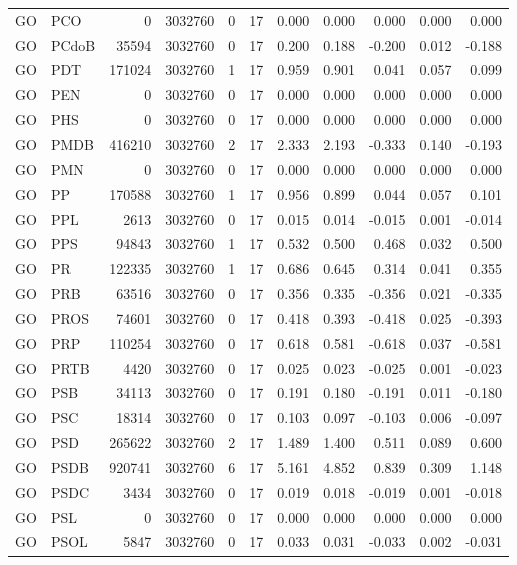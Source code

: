 \begin{landscape}
\begin{longtable}{llrrrrrrrrr}
GO & PCO & 0 & 3032760 & 0 & 17 & 0.000 & 0.000 & 0.000 & 0.000 & 0.000 \\
GO & PCdoB & 35594 & 3032760 & 0 & 17 & 0.200 & 0.188 & -0.200 & 0.012 & -0.188 \\
GO & PDT & 171024 & 3032760 & 1 & 17 & 0.959 & 0.901 & 0.041 & 0.057 & 0.099 \\
GO & PEN & 0 & 3032760 & 0 & 17 & 0.000 & 0.000 & 0.000 & 0.000 & 0.000 \\
GO & PHS & 0 & 3032760 & 0 & 17 & 0.000 & 0.000 & 0.000 & 0.000 & 0.000 \\
GO & PMDB & 416210 & 3032760 & 2 & 17 & 2.333 & 2.193 & -0.333 & 0.140 & -0.193 \\
GO & PMN & 0 & 3032760 & 0 & 17 & 0.000 & 0.000 & 0.000 & 0.000 & 0.000 \\
GO & PP & 170588 & 3032760 & 1 & 17 & 0.956 & 0.899 & 0.044 & 0.057 & 0.101 \\
GO & PPL & 2613 & 3032760 & 0 & 17 & 0.015 & 0.014 & -0.015 & 0.001 & -0.014 \\
GO & PPS & 94843 & 3032760 & 1 & 17 & 0.532 & 0.500 & 0.468 & 0.032 & 0.500 \\
GO & PR & 122335 & 3032760 & 1 & 17 & 0.686 & 0.645 & 0.314 & 0.041 & 0.355 \\
GO & PRB & 63516 & 3032760 & 0 & 17 & 0.356 & 0.335 & -0.356 & 0.021 & -0.335 \\
GO & PROS & 74601 & 3032760 & 0 & 17 & 0.418 & 0.393 & -0.418 & 0.025 & -0.393 \\
GO & PRP & 110254 & 3032760 & 0 & 17 & 0.618 & 0.581 & -0.618 & 0.037 & -0.581 \\
GO & PRTB & 4420 & 3032760 & 0 & 17 & 0.025 & 0.023 & -0.025 & 0.001 & -0.023 \\
GO & PSB & 34113 & 3032760 & 0 & 17 & 0.191 & 0.180 & -0.191 & 0.011 & -0.180 \\
GO & PSC & 18314 & 3032760 & 0 & 17 & 0.103 & 0.097 & -0.103 & 0.006 & -0.097 \\
GO & PSD & 265622 & 3032760 & 2 & 17 & 1.489 & 1.400 & 0.511 & 0.089 & 0.600 \\
GO & PSDB & 920741 & 3032760 & 6 & 17 & 5.161 & 4.852 & 0.839 & 0.309 & 1.148 \\
GO & PSDC & 3434 & 3032760 & 0 & 17 & 0.019 & 0.018 & -0.019 & 0.001 & -0.018 \\
GO & PSL & 0 & 3032760 & 0 & 17 & 0.000 & 0.000 & 0.000 & 0.000 & 0.000 \\
GO & PSOL & 5847 & 3032760 & 0 & 17 & 0.033 & 0.031 & -0.033 & 0.002 & -0.031 \\

\end{longtable}
\end{landscape}
